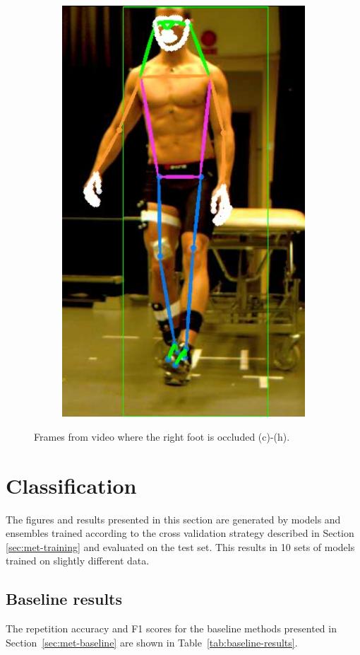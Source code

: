 {\begin{figure}[h]
\begin{subfigure}[t]{0.22\textwidth}
    \includegraphics[height=1.3\textwidth]{files/figs/res/hpe/36-8.png}
    \caption{}
  \end{subfigure}

  \caption{Frames from video where the right foot is occluded (c)-(h).}
  \label{fig:occluded}
\end{figure}
}

\FloatBarrier
\section{Classification}
The figures and results presented in this section are generated by models and ensembles trained according to the cross validation strategy described in Section \ref{sec:met-training} and evaluated on the test set. This results in 10 sets of models trained on slightly different data.

\subsection{Baseline results}
The repetition accuracy and F1 scores for the baseline methods presented in Section~\ref{sec:met-baseline} are shown in Table~\ref{tab:baseline-results}.

